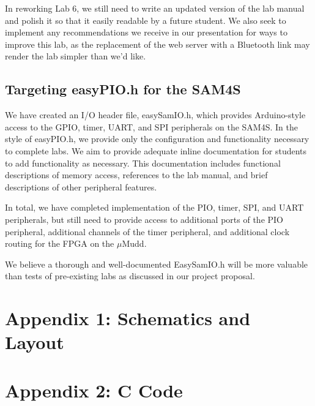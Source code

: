 \documentclass[12pt]{article}
\begin{document}
In reworking Lab 6, we still need to write an updated version of the lab manual and polish it so that it easily readable by a future student. We also seek to implement any recommendations we receive in our presentation for ways to improve this lab, as the replacement of the web server with a Bluetooth link may render the lab simpler than we'd like.

\subsection{Targeting easyPIO.h for the SAM4S}

We have created an I/O header file, easySamIO.h, which provides Arduino-style access to the GPIO, timer, UART, and SPI peripherals on the SAM4S. In the style of easyPIO.h, we provide only the configuration and functionality necessary to complete labs. We aim to provide adequate inline documentation for students to add functionality as necessary. This documentation includes functional descriptions of memory access, references to the lab manual, and brief descriptions of other peripheral features.

In total, we have completed implementation of the PIO, timer, SPI, and UART peripherals, but still need to provide access to additional ports of the PIO peripheral, additional channels of the timer peripheral, and additional clock routing for the FPGA on the $\mu$Mudd.

We believe a thorough and well-documented EasySamIO.h will be more valuable than tests of pre-existing labs as discussed in our project proposal.

\clearpage
\section{Appendix 1: Schematics and Layout}
\clearpage
\section{Appendix 2: C Code}
\end{document}
